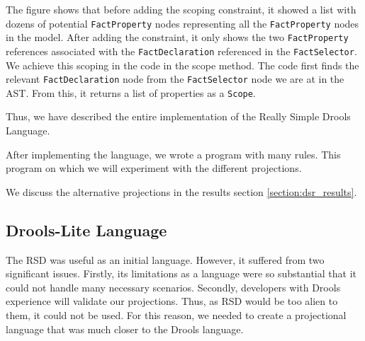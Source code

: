The figure shows that before adding the scoping constraint, it showed a list with dozens of potential \texttt{FactProperty} nodes representing all the \texttt{FactProperty} nodes in the model.
After adding the constraint, it only shows the two \texttt{FactProperty} references associated with the \texttt{FactDeclaration} referenced in the \texttt{FactSelector}.
We achieve this scoping in the code in the scope method.
The code first finds the relevant \texttt{FactDeclaration} node from the \texttt{FactSelector} node we are at in the AST.
From this, it returns a list of properties as a \texttt{Scope}.

Thus, we have described the entire implementation of the Really Simple Drools Language.

After implementing the language, we wrote a program with many rules.
This program on which we will experiment with the different projections.

We discuss the alternative projections in the results section \ref{section:dsr_results}.

\newpage
\subsection{Drools-Lite Language}
\label{section:DroolsLite}

The RSD was useful as an initial language. 
However, it suffered from two significant issues.
Firstly, its limitations as a language were so substantial that it could not handle many necessary scenarios.
Secondly, developers with Drools experience will validate our projections. 
Thus, as RSD would be too alien to them, it could not be used. 
For this reason, we needed to create a projectional language that was much closer to the Drools language.

